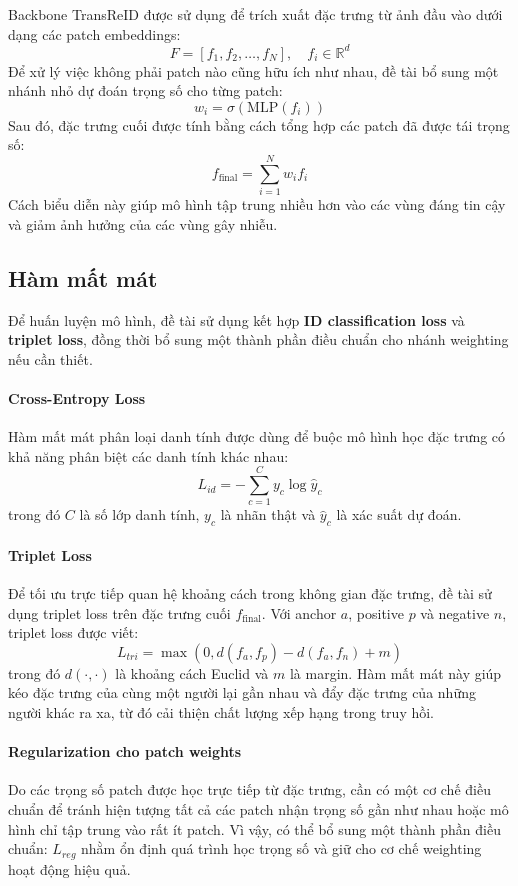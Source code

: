 Backbone TransReID được sử dụng để trích xuất đặc trưng từ ảnh đầu vào dưới dạng các patch embeddings:
\[
F = [f_1,f_2,\dots,f_N], \quad f_i \in \mathbb{R}^d
\]
Để xử lý việc không phải patch nào cũng hữu ích như nhau, đề tài bổ sung một nhánh nhỏ dự đoán trọng số cho từng patch:
\[
w_i = \sigma(\text{MLP}(f_i))
\]
Sau đó, đặc trưng cuối được tính bằng cách tổng hợp các patch đã được tái trọng số:
\[
f_{\text{final}} = \sum_{i=1}^{N} w_i f_i
\]
Cách biểu diễn này giúp mô hình tập trung nhiều hơn vào các vùng đáng tin cậy và giảm ảnh hưởng của các vùng gây nhiễu.

\subsection{Hàm mất mát}
Để huấn luyện mô hình, đề tài sử dụng kết hợp \textbf{ID classification loss} và \textbf{triplet loss}, đồng thời bổ sung một thành phần điều chuẩn cho nhánh weighting nếu cần thiết.

\paragraph{Cross-Entropy Loss} Hàm mất mát phân loại danh tính được dùng để buộc mô hình học đặc trưng có khả năng phân biệt các danh tính khác nhau:
\[
L_{id} = - \sum_{c=1}^{C} y_c \log \hat{y}_c
\]
trong đó \(C\) là số lớp danh tính, \(y_c\) là nhãn thật và \(\hat{y}_c\) là xác suất dự đoán.

\paragraph{Triplet Loss} Để tối ưu trực tiếp quan hệ khoảng cách trong không gian đặc trưng, đề tài sử dụng triplet loss trên đặc trưng cuối \(f_{\text{final}}\). Với anchor \(a\), positive \(p\) và negative \(n\), triplet loss được viết:
\[
L_{tri} = \max \left(0, d(f_a,f_p) - d(f_a,f_n) + m \right)
\]
trong đó \(d(\cdot,\cdot)\) là khoảng cách Euclid và \(m\) là margin. Hàm mất mát này giúp kéo đặc trưng của cùng một người lại gần nhau và đẩy đặc trưng của những người khác ra xa, từ đó cải thiện chất lượng xếp hạng trong truy hồi.

\paragraph{Regularization cho patch weights} Do các trọng số patch được học trực tiếp từ đặc trưng, cần có một cơ chế điều chuẩn để tránh hiện tượng tất cả các patch nhận trọng số gần như nhau hoặc mô hình chỉ tập trung vào rất ít patch. Vì vậy, có thể bổ sung một thành phần điều chuẩn: $L_{reg}$ 
nhằm ổn định quá trình học trọng số và giữ cho cơ chế weighting hoạt động hiệu quả.

